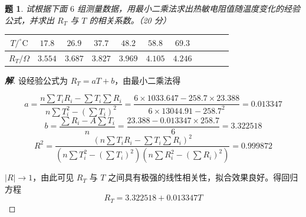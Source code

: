 \documentclass{article}
\newtheorem{problem}{题}
\newenvironment{solution}
{\begin{proof}[\textbf{解}]\renewcommand{\qedsymbol}{}}
{\end{proof}}
\begin{document}
\begin{problem}
试根据下面 $6$ 组测量数据，用最小二乘法求出热敏电阻值随温度变化的经验公式，并求出 $R_T$ 与 $T$ 的相关系数。（20 分）

\begin{table}[h]
\centering
\begin{tabular}{ccccccccccc}
\toprule
$T / ^\circ\text{C}$ & $17.8$ & $26.9$ & $37.7$ & $48.2$ & $58.8$ & $69.3$  \\ \midrule
$R_T / \Omega$ & $3.554$ & $3.687$ & $3.827$ & $3.969$ & $4.105$ & $4.246$ \\ \bottomrule
\end{tabular}
\end{table}
\end{problem}

\begin{solution}

设经验公式为 $R_T = aT + b$，由最小二乘法得 

\[
  a = \frac{n \sum T_i R_i - \sum T_i \sum R_i}{n \sum T_i^2 - \left(\sum T_i\right)^2} = \frac{6 \times 1033.647 - 258.7 \times 23.388}{6 \times 13044.91 - 258.7^2} = 0.013347
\]
\[
  b = \frac{\sum R_i - A \sum T_i}{n} = \frac{23.388 - 0.013347 \times 258.7}{6} = 3.322518
\]
\[
  R^2 = \frac{\left(n \sum T_i R_i - \sum T_i \sum R_i\right)^2}{{\left(n \sum T_i^2 - \left(\sum T_i\right)^2\right)\left(n \sum R_i^2 - \left(\sum R_i\right)^2\right)}} = 0.999872
\]

\begin{center}
\end{center}

$|R| \to 1$，由此可见 $R_T$ 与 $T$ 之间具有极强的线性相关性，拟合效果良好。得回归方程
\[
R_T = 3.322518 + 0.013347T
\]
\end{solution}
\end{document}
